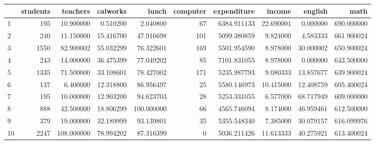 \begin{tabular}{lrrrrrrrrr}
\toprule
{} &  students &    teachers &   calworks &       lunch &  computer &  expenditure &     income &    english &        math \\
\midrule
1  &       195 &   10.900000 &   0.510200 &    2.040800 &        67 &  6384.911133 &  22.690001 &   0.000000 &  690.000000 \\
2  &       240 &   11.150000 &  15.416700 &   47.916698 &       101 &  5099.380859 &   9.824000 &   4.583333 &  661.900024 \\
3  &      1550 &   82.900002 &  55.032299 &   76.322601 &       169 &  5501.954590 &   8.978000 &  30.000002 &  650.900024 \\
4  &       243 &   14.000000 &  36.475399 &   77.049202 &        85 &  7101.831055 &   8.978000 &   0.000000 &  643.500000 \\
5  &      1335 &   71.500000 &  33.108601 &   78.427002 &       171 &  5235.987793 &   9.080333 &  13.857677 &  639.900024 \\
6  &       137 &    6.400000 &  12.318800 &   86.956497 &        25 &  5580.146973 &  10.415000 &  12.408759 &  605.400024 \\
7  &       195 &   10.000000 &  12.903200 &   94.623703 &        28 &  5253.331055 &   6.577000 &  68.717949 &  609.000000 \\
8  &       888 &   42.500000 &  18.806299 &  100.000000 &        66 &  4565.746094 &   8.174000 &  46.959461 &  612.500000 \\
9  &       379 &   19.000000 &  32.189999 &   93.139801 &        35 &  5355.548340 &   7.385000 &  30.079157 &  616.099976 \\
10 &      2247 &  108.000000 &  78.994202 &   87.316399 &         0 &  5036.211426 &  11.613333 &  40.275921 &  613.400024 \\
\bottomrule
\end{tabular}
